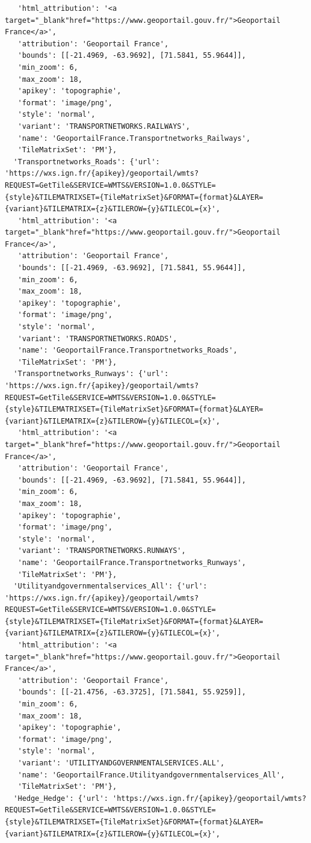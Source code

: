 \documentclass[
  letterpaper,
  DIV=11,
  numbers=noendperiod]{scrreprt}
\begin{document}
\begin{verbatim}
   'html_attribution': '<a target="_blank"href="https://www.geoportail.gouv.fr/">Geoportail France</a>',
   'attribution': 'Geoportail France',
   'bounds': [[-21.4969, -63.9692], [71.5841, 55.9644]],
   'min_zoom': 6,
   'max_zoom': 18,
   'apikey': 'topographie',
   'format': 'image/png',
   'style': 'normal',
   'variant': 'TRANSPORTNETWORKS.RAILWAYS',
   'name': 'GeoportailFrance.Transportnetworks_Railways',
   'TileMatrixSet': 'PM'},
  'Transportnetworks_Roads': {'url': 'https://wxs.ign.fr/{apikey}/geoportail/wmts?REQUEST=GetTile&SERVICE=WMTS&VERSION=1.0.0&STYLE={style}&TILEMATRIXSET={TileMatrixSet}&FORMAT={format}&LAYER={variant}&TILEMATRIX={z}&TILEROW={y}&TILECOL={x}',
   'html_attribution': '<a target="_blank"href="https://www.geoportail.gouv.fr/">Geoportail France</a>',
   'attribution': 'Geoportail France',
   'bounds': [[-21.4969, -63.9692], [71.5841, 55.9644]],
   'min_zoom': 6,
   'max_zoom': 18,
   'apikey': 'topographie',
   'format': 'image/png',
   'style': 'normal',
   'variant': 'TRANSPORTNETWORKS.ROADS',
   'name': 'GeoportailFrance.Transportnetworks_Roads',
   'TileMatrixSet': 'PM'},
  'Transportnetworks_Runways': {'url': 'https://wxs.ign.fr/{apikey}/geoportail/wmts?REQUEST=GetTile&SERVICE=WMTS&VERSION=1.0.0&STYLE={style}&TILEMATRIXSET={TileMatrixSet}&FORMAT={format}&LAYER={variant}&TILEMATRIX={z}&TILEROW={y}&TILECOL={x}',
   'html_attribution': '<a target="_blank"href="https://www.geoportail.gouv.fr/">Geoportail France</a>',
   'attribution': 'Geoportail France',
   'bounds': [[-21.4969, -63.9692], [71.5841, 55.9644]],
   'min_zoom': 6,
   'max_zoom': 18,
   'apikey': 'topographie',
   'format': 'image/png',
   'style': 'normal',
   'variant': 'TRANSPORTNETWORKS.RUNWAYS',
   'name': 'GeoportailFrance.Transportnetworks_Runways',
   'TileMatrixSet': 'PM'},
  'Utilityandgovernmentalservices_All': {'url': 'https://wxs.ign.fr/{apikey}/geoportail/wmts?REQUEST=GetTile&SERVICE=WMTS&VERSION=1.0.0&STYLE={style}&TILEMATRIXSET={TileMatrixSet}&FORMAT={format}&LAYER={variant}&TILEMATRIX={z}&TILEROW={y}&TILECOL={x}',
   'html_attribution': '<a target="_blank"href="https://www.geoportail.gouv.fr/">Geoportail France</a>',
   'attribution': 'Geoportail France',
   'bounds': [[-21.4756, -63.3725], [71.5841, 55.9259]],
   'min_zoom': 6,
   'max_zoom': 18,
   'apikey': 'topographie',
   'format': 'image/png',
   'style': 'normal',
   'variant': 'UTILITYANDGOVERNMENTALSERVICES.ALL',
   'name': 'GeoportailFrance.Utilityandgovernmentalservices_All',
   'TileMatrixSet': 'PM'},
  'Hedge_Hedge': {'url': 'https://wxs.ign.fr/{apikey}/geoportail/wmts?REQUEST=GetTile&SERVICE=WMTS&VERSION=1.0.0&STYLE={style}&TILEMATRIXSET={TileMatrixSet}&FORMAT={format}&LAYER={variant}&TILEMATRIX={z}&TILEROW={y}&TILECOL={x}',

\end{verbatim}
\end{document}
